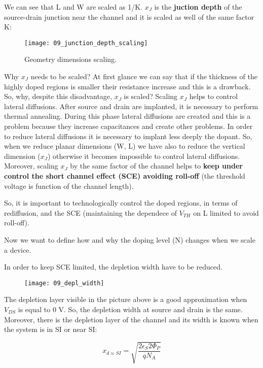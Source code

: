 \documentclass[a4paper, 12pt, twoside, openright]{report}
\begin{document}
We can see that L and W are scaled as 1/K. $x_{J}$ is the \textbf{juction depth} of the source-drain junction near the channel and it is scaled as well of the same factor K:

	\begin{figure}[!h]
	\centering
	\texttt{[image: 09\_junction\_depth\_scaling]}
	\caption{Geometry dimensions scaling.}
	\label{}
	\end{figure}

Why $x_{J}$ needs to be scaled? At first glance we can say that if the thickness of the highly doped regions is smaller their resistance increase and this is a drawback. So, why, despite this disadvantage, $x_{J}$ is scaled? Scaling $x_{J}$ helps to control lateral diffusions. After source and drain are implanted, it is necessary to perform thermal annealing. During this phase lateral diffusions are created and this is a problem because they increase capacitances and create other problems. In order to reduce lateral diffusions it is necessary to implant less deeply the dopant. So, when we reduce planar dimensions (W, L) we have also to reduce the vertical dimension ($x_{J}$) otherwise it becomes impossible to control lateral diffusions. Moreover, scaling $x_{J}$ by the same factor of the channel helps to \textbf{keep under control the short channel effect (SCE) avoiding roll-off} (the threshold voltage is function of the channel length).

So, it is important to technologically control the doped regions, in terms of rediffusion, and the SCE (maintaining the dependece of $V_{TH}$ on L limited to avoid roll-off).

Now we want to define how and why the doping level (N) changes when we scale a device. 

In order to keep SCE limited, the depletion width have to be reduced.

\newpage

	\begin{figure}[H]
	\centering
	\texttt{[image: 09\_depl\_width]}
	\caption{}
	\label{}
	\end{figure}

The depletion layer visible in the picture above is a good approximation when $V_{DS}$ is equal to 0 V. So, the depletion width at source and drain is the same. Moreover, there is the depletion layer of the channel and its width is known when the system is in SI or near SI:

	\begin{equation}
	x_{d \approx SI} = \sqrt{\frac{2 \epsilon_S 2 \Phi_P}{q N_A}}
	\label{}
	\end{equation}
\end{document}
